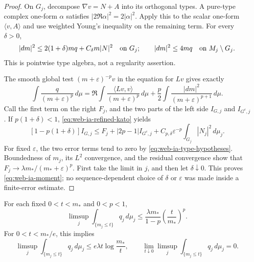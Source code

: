 \begin{proof}
On \(G_j\), decompose \(\nabla v=N+A\) into its orthogonal types.
A pure-type complex one-form \(\alpha\) satisfies
\(|2\Re\alpha|^2=2|\alpha|^2\).  Apply this to the scalar one-form
\(\langle v,A\rangle\) and use weighted Young's inequality on the
remaining term.  For every \(\delta>0\),
\begin{equation}
 |dm|^2\le2(1+\delta)m q+C_\delta m|N|^2
       \quad\hbox{on }G_j;
 \qquad |dm|^2\le4mq\quad\hbox{on }M_j\setminus G_j.
 \label{eq:web-ia-refined-kato}
\end{equation}
This is pointwise type algebra, not a regularity assertion.

The smooth global test \((m+\varepsilon)^{-p}v\) in the equation for
\(Lv\) gives exactly
\begin{equation}
 \int\frac{q}{(m+\varepsilon)^p}\,d\mu
 =\Re\int\frac{\langle Lv,v\rangle}{(m+\varepsilon)^p}\,d\mu
       +\frac p2\int\frac{|dm|^2}{(m+\varepsilon)^{p+1}}\,d\mu.
 \label{eq:web-ia-test-identity}
\end{equation}
Call the first term on the right \(F_j\), and the two parts of the left
side \(I_{G,j}\) and \(I_{G^c,j}\).  If \(p(1+\delta)<1\),
\eqref{eq:web-ia-refined-kato} yields
\[
 [1-p(1+\delta)]I_{G,j}
 \le F_j+|2p-1|I_{G^c,j}
       +C_{p,\delta}\varepsilon^{-p}\int_{G_j}|N_j|^2\,d\mu_j.
\]
For fixed \(\varepsilon\), the two error terms tend to zero by
\eqref{eq:web-ia-type-hypotheses}.  Boundedness of \(m_j\), its
\(L^2\) convergence, and the residual convergence show that
\(F_j\to\lambda m_* /(m_*+\varepsilon)^p\).
First take the limit in \(j\), and then let \(\delta\downarrow0\).
This proves \eqref{eq:web-ia-moment}; no sequence-dependent choice of
\(\delta\) or \(\varepsilon\) was made inside a finite-error estimate.
\end{proof}

\begin{corollary}
\label{cor:web-ia-deep-wells}
For each fixed \(0<t<m_*\) and \(0<p<1\),
\begin{equation}
 \limsup_j\int_{\{m_j\le t\}}q_j\,d\mu_j
       \le\frac{\lambda m_*}{1-p}\left(\frac t{m_*}\right)^p.
 \label{eq:web-ia-low-amplitude-power}
\end{equation}
For \(0<t<m_*/e\), this implies
\begin{equation}
 \limsup_j\int_{\{m_j\le t\}}q_j\,d\mu_j
       \le e\lambda t\log\frac{m_*}{t},\qquad
 \lim_{t\downarrow0}\limsup_j\int_{\{m_j\le t\}}q_j\,d\mu_j=0.
 \label{eq:web-ia-low-amplitude-log}
\end{equation}
\end{corollary}

